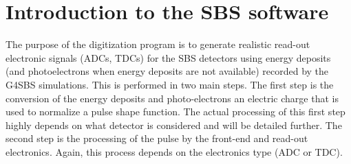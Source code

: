 \section{Introduction to the SBS software}


The purpose of the digitization program is to generate realistic read-out electronic signals (ADCs, TDCs) for the SBS detectors using energy deposits (and photoelectrons when energy deposits are not available) recorded by the G4SBS simulations. This is performed in two main steps. The first step is the conversion of the energy deposits and photo-electrons an electric charge that is used to normalize a pulse shape function. The actual processing of this first step highly depends on what detector is considered and will be detailed further. The second step is the processing of the pulse by the front-end and read-out electronics. Again, this process depends on the electronics type (ADC or TDC).
